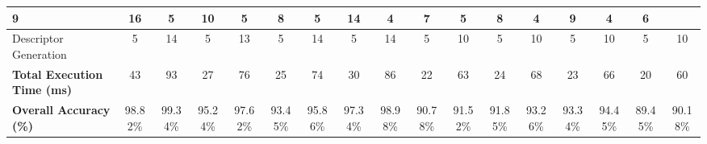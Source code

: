 \begin{table}[h]
{\begin{tabular}{l|c|c|c|c|c|c|c|c|c|c|c|c|c|c|c|c}
  9 &
  16 &
  5 &
  10 &
  5 &
  8 &
  5 &
  14 &
  4 &
  7 &
  5 &
  8 &
  4 &
  9 &
  4 &
  6 \\ \midrule
Descriptor Generation &
  5 &
  14 &
  5 &
  13 &
  5 &
  14 &
  5 &
  14 &
  5 &
  10 &
  5 &
  10 &
  5 &
  10 &
  5 &
  10 \\ \midrule \midrule
  \rowcolor{Gray1} 
\textbf{Total Execution Time (ms)} &
  43 &
  93 &
  27 &
  76 &
  25 &
  74 &
  30 &
  86 &
  22 &
  63 &
  24 &
  68 &
  23 &
  66 &
  20 &
  60 \\ \midrule\midrule
  \rowcolor{Gray1} 
\textbf{Overall Accuracy (\%)} &
  98.82\% &
  99.34\% &
  95.24\% &
  97.62\% &
  93.45\% &
  95.86\% &
  97.34\% &
  98.98\% &
  90.78\% &
  91.52\% &
  91.85\% &
  93.26\% &
  93.34\% &
  94.45\% &
  89.45\% &
  90.18\% \\ \bottomrule
\end{tabular}
}
\end{table}
